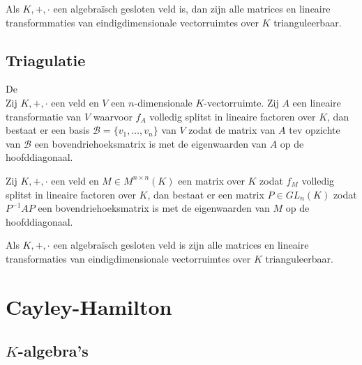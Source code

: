 \documentclass[main.tex]{subfiles}
\begin{document}
\begin{gev}
  Als $K,+,\cdot$ een algebra\"isch gesloten veld is, dan zijn alle matrices en lineaire transformmaties van eindigdimensionale vectorruimtes over $K$ trianguleerbaar.
\end{gev}

\subsection{Triagulatie}
\label{sec:triagulatie}

\begin{st}
  De \\
  Zij $K,+,\cdot$ een veld en $V$ een $n$-dimensionale $K$-vectorruimte.
  Zij $A$ een lineaire transformatie van $V$ waarvoor $f_{A}$ volledig splitst in lineaire factoren over $K$, dan bestaat er een basis $\mathcal{B} = \{ v_{1},\dotsc,v_{n} \}$ van $V$ zodat de matrix van $A$ tev opzichte van $\mathcal{B}$ een bovendriehoeksmatrix is met de eigenwaarden van $A$ op de hoofddiagonaal.
\end{st}

\begin{gev}
  Zij $K,+,\cdot$ een veld en $M\in M^{n\times n}(K)$ een matrix over $K$ zodat $f_{M}$ volledig splitst in lineaire factoren over $K$, dan bestaat er een matrix $P\in GL_{n}(K)$ zodat $P^{-1}AP$ een bovendriehoeksmatrix is met de eigenwaarden van $M$ op de hoofddiagonaal.
\end{gev}

\begin{opm}
  Als $K,+,\cdot$ een algebra\"isch gesloten veld is zijn alle matrices en lineaire transformaties van eindigdimensionale vectorruimtes over $K$ trianguleerbaar.
\end{opm}

\section{Cayley-Hamilton}
\label{sec:cayley-hamilton}

\subsection{$K$-algebra's}
\label{sec:k-algebras}
\end{document}
